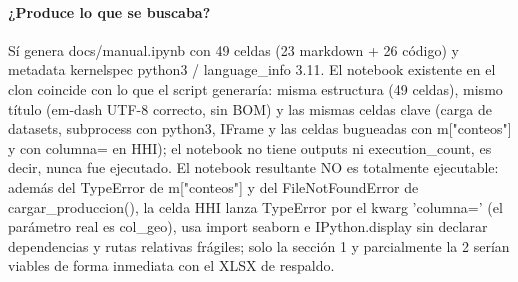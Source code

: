 \paragraph{¿Produce lo que se buscaba?}
Sí genera docs/manual.ipynb con 49 celdas (23 markdown + 26 código) y metadata kernelspec python3 / language\_info 3.11. El notebook existente en el clon coincide con lo que el script generaría: misma estructura (49 celdas), mismo título (em-dash UTF-8 correcto, sin BOM) y las mismas celdas clave (carga de datasets, subprocess con python3, IFrame y las celdas bugueadas con m["conteos"] y con columna= en HHI); el notebook no tiene outputs ni execution\_count, es decir, nunca fue ejecutado. El notebook resultante NO es totalmente ejecutable: además del TypeError de m["conteos"] y del FileNotFoundError de cargar\_produccion(), la celda HHI lanza TypeError por el kwarg 'columna=' (el parámetro real es col\_geo), usa import seaborn e IPython.display sin declarar dependencias y rutas relativas frágiles; solo la sección 1 y parcialmente la 2 serían viables de forma inmediata con el XLSX de respaldo.

